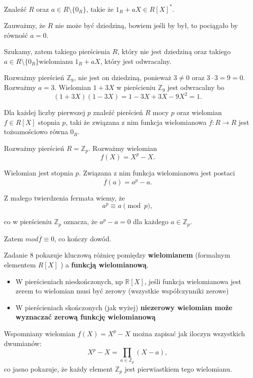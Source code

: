 \begin{problem}[7]
	Znaleźć $R$ oraz $a\in R\setminus \{0_{R}\} $, takie że $1_{R} + aX \in R\left[ X \right] ^{\ast} $.
\end{problem} 
\begin{solution}
	Zauważmy, że $R$ nie może być dziedziną, bowiem jeśli by był, to pociągało by równość  $a=0$.

	Szukamy, zatem takiego pierścienia $R$, który nie jest dziedziną oraz takiego $a \in R\setminus \{0_{R}\} $wielomianu $1_{R} + aX$, który jest odwracalny.  

	Rozważmy pierścień $\mathbb{Z}_{9}$, nie jest on dziedziną, ponieważ $3 \neq 0$ oraz $3\cdot 3 = 9 = 0$. Rozważmy $a = 3$.
	Wielomian  $1 + 3X$ w pierścieniu  $\mathbb{Z}_{9}$ jest odwracalny bo
	\[
		\left( 1 + 3X \right) \left( 1 - 3X \right) = 1 - 3X + 3X - 9X^2 = 1 
	.\] 
\end{solution} 
\begin{problem}[8]
	Dla każdej liczby pierwszej $p$ znaleźć pierścień $R$ mocy $p$ oraz wielomian $f \in R\left[ X \right] $ stopnia $p$, taki że związana z nim funkcja wielomianowa $\overline{f}: R \to R$ jest tożsamościowo równa $0_{R}$.
\end{problem} 
\begin{solution}
	Rozważmy pierścień $R = \mathbb{Z}_{p}$. Rozważmy wielomian
	\[
	f\left( X \right) = X^{p} - X
	.\] 
	
	Wielomian jest stopnia $p$. Związana z nim funkcja wielomianowa jest postaci 
	\[
	 \overline{f}\left( a \right) = a^{p} - a
	.\] 

	Z małego twierdzenia fermata wiemy, że 
	\[
	a^{p} \equiv a \pmod{p} 
	,\] 

	co w pierścieniu $\mathbb{Z}_{p}$ oznacza, że $a^{p}-a = 0$ dla każdego $a \in \mathbb{Z}_{p}$. 
	
	Zatem  $mod\overline{f} \equiv 0$, co kończy dowód.
\end{solution} 
\begin{remark}
	Zadanie 8 pokazuje kluczową różnicę pomiędzy \textbf{wielomianem} (formalnym elementem $R\left[ X \right] $ ) a \textbf{funkcją wielomianową}.  

	\begin{itemize}
		\item W pierścieniach nieskończonych, np $\mathbb{R} \left[ X \right] $, jeśli funkcja wielomianowa jest zerem to wielomian musi być zerowy (wszystkie współczynniki zerowe)
		\item W pierścieniach skończonych (jak wyżej) \textbf{niezerowy wielomian może wyznaczać zerową funkcję wielomianową} 
	\end{itemize}

	Wspomniany wielomian $f\left( X \right) = X^{p}-X$ można zapisać jak iloczyn wszystkich dwumianów:
	\[
	X^{p} - X = \prod_{a \in \mathbb{Z}_{p}}\left( X - a \right) 
	,\] 
	co jasno pokazuje, że każdy element $\mathbb{Z} _{p}$ jest pierwiastkiem tego wielomianu.
\end{remark} 
